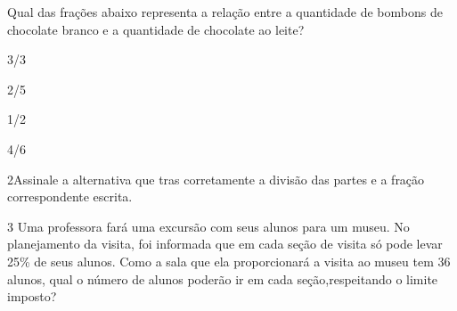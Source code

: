 Qual das frações abaixo representa a relação entre a quantidade de
bombons de chocolate branco e a quantidade de chocolate ao leite?

\begin{escolha}
\item
  3/3
\item
  2/5
\item
  1/2
\item
  4/6
\end{escolha}


\num{2}Assinale a alternativa que tras corretamente a divisão das partes e
a fração correspondente escrita.

%
%
%
%
%
%
%
%


\num{3} Uma professora fará uma excursão com seus alunos para um museu. No
planejamento da visita, foi informada que em cada seção de visita só
pode levar 25\% de seus alunos. Como a sala que ela proporcionará a
visita ao museu tem 36 alunos, qual o número de alunos poderão ir em
cada seção,respeitando o limite imposto?

